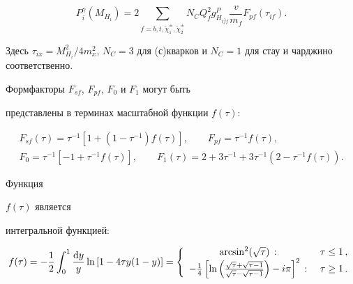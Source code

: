 $$

 P^{\gamma}_i(M_{H_i}) = 2 \sum_{f=b,t,\tilde{\chi}^{\pm}_{1},\tilde{\chi}^{\pm}_{2}} N_C Q^{2}_{f} g^{P}_{H_{i

\bar{f} f}} \frac{v}{m_f} F_{p f}(\tau_{i f}).


$$


Здесь $\tau_{ix}=M_{H_i}^2/4m_x^2$, $N_C=3$ для (с)кварков и $N_C=1$ для стау и чарджино соответственно.



Формфакторы $F_{sf}$, $F_{pf}$, $F_0$ и $F_1$ могут быть

представлены в терминах масштабной функции $f(\tau)$:

%



\begin{gather}

\label{eq:gurs:widthH3}

F_{s f}(\tau) = \tau^{-1}[1 + (1 - \tau^{-1})f(\tau)], 

\qquad  F_{p f} = \tau^{-1} f(\tau),

\\

F_0 = \tau^{-1}[-1 + \tau^{-1}f(\tau)], \qquad 

 F_1 (\tau) = 2 +

3\tau^{-1} + 3\tau^{-1} (2 - \tau^{-1}f(\tau)).

\end{gather}

Функция

 $f(\tau)$ является

интегральной функцией:

%

\begin{eqnarray}\label{eq:gurs:widthH4}

f(\tau)=-\frac{1}{2}\int_0^1\frac{{\rm d}y}{y}\ln\left[1-4\tau

y(1-y)\right]

       =\left\{\begin{array}{cl}

           {\rm arcsin}^2(\sqrt{\tau}) \,:   & ~ \tau\leq 1\,, \\

   -\frac{1}{4}\left[\ln \left(\frac{\sqrt{\tau}+\sqrt{\tau-1}}{

                                     \sqrt{\tau}-\sqrt{\tau-1}}\right)

                    -i\pi\right]^2\,: & ~ \tau\geq 1\,.

\end{array}\right.

\end{eqnarray}



